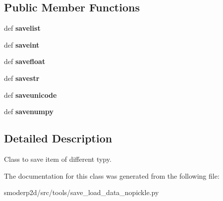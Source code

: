\subsection*{Public Member Functions}
\begin{DoxyCompactItemize}
\item 
\hypertarget{classsmoderp2d_1_1src_1_1tools_1_1save__load__data__nopickle_1_1SaveItems_a9b7ab58852c2ec9ac5eef3697891a971}{def {\bfseries savelist}}\label{classsmoderp2d_1_1src_1_1tools_1_1save__load__data__nopickle_1_1SaveItems_a9b7ab58852c2ec9ac5eef3697891a971}

\item 
\hypertarget{classsmoderp2d_1_1src_1_1tools_1_1save__load__data__nopickle_1_1SaveItems_aae4bd717ff245f0866e1a3d2344f6e88}{def {\bfseries saveint}}\label{classsmoderp2d_1_1src_1_1tools_1_1save__load__data__nopickle_1_1SaveItems_aae4bd717ff245f0866e1a3d2344f6e88}

\item 
\hypertarget{classsmoderp2d_1_1src_1_1tools_1_1save__load__data__nopickle_1_1SaveItems_aaa5119329a342c10796e2bbbe43a4c04}{def {\bfseries savefloat}}\label{classsmoderp2d_1_1src_1_1tools_1_1save__load__data__nopickle_1_1SaveItems_aaa5119329a342c10796e2bbbe43a4c04}

\item 
\hypertarget{classsmoderp2d_1_1src_1_1tools_1_1save__load__data__nopickle_1_1SaveItems_a9aeb5708cc4eec875ecdde27a41359b1}{def {\bfseries savestr}}\label{classsmoderp2d_1_1src_1_1tools_1_1save__load__data__nopickle_1_1SaveItems_a9aeb5708cc4eec875ecdde27a41359b1}

\item 
\hypertarget{classsmoderp2d_1_1src_1_1tools_1_1save__load__data__nopickle_1_1SaveItems_aec22b79dd1a286a28cd142ddd07deaae}{def {\bfseries saveunicode}}\label{classsmoderp2d_1_1src_1_1tools_1_1save__load__data__nopickle_1_1SaveItems_aec22b79dd1a286a28cd142ddd07deaae}

\item 
\hypertarget{classsmoderp2d_1_1src_1_1tools_1_1save__load__data__nopickle_1_1SaveItems_ac9ca6022e3f3045e5bd4a1327656ee63}{def {\bfseries savenumpy}}\label{classsmoderp2d_1_1src_1_1tools_1_1save__load__data__nopickle_1_1SaveItems_ac9ca6022e3f3045e5bd4a1327656ee63}

\end{DoxyCompactItemize}


\subsection{Detailed Description}
Class to save item of different typy. 

The documentation for this class was generated from the following file\-:\begin{DoxyCompactItemize}
\item 
smoderp2d/src/tools/save\-\_\-load\-\_\-data\-\_\-nopickle.\-py\end{DoxyCompactItemize}
